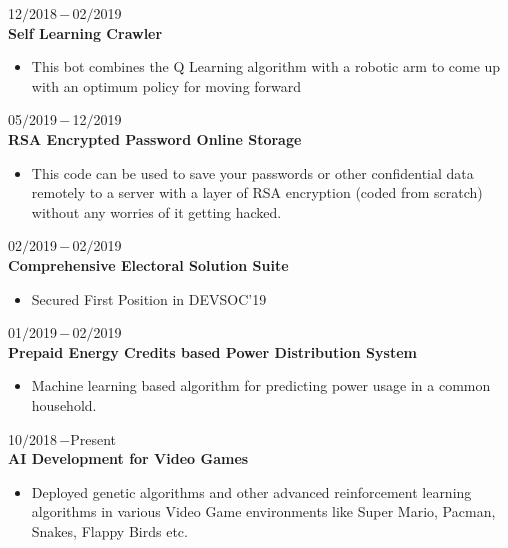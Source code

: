 \documentclass[a4paper, 12pt]{article}
\begin{document}
    \begin{flushleft}
    	12$/$2018\,$-$\,02$/$2019\\
    	\textbf{Self Learning Crawler}
    	\begin{itemize}
    		\item This bot combines the Q Learning algorithm with a robotic arm to come up with an optimum
policy for moving forward
    	\end{itemize}
    \end{flushleft}
    
    \begin{flushleft}
    	05$/$2019\,$-$\,12$/$2019\\
    	\textbf{RSA Encrypted Password Online Storage}
    	\begin{itemize}
    		\item This code can be used to save your passwords or other confidential data remotely to a server with a layer of RSA encryption (coded from scratch) without any worries of it getting hacked.
    	\end{itemize}
    \end{flushleft}
    
    \begin{flushleft}
    	02$/$2019\,$-$\,02$/$2019\\
    	\textbf{Comprehensive Electoral Solution Suite}
    	\begin{itemize}
    		\item Secured First Position in DEVSOC'19
    	\end{itemize}
    \end{flushleft}
    
    \begin{flushleft}
    	01$/$2019\,$-$\,02$/$2019\\
    	\textbf{Prepaid Energy Credits based Power Distribution System}
    	\begin{itemize}
    		\item Machine learning based algorithm for predicting power usage in a common household.
    	\end{itemize}
    \end{flushleft}    
    
    \begin{flushleft}
    	10$/$2018\,$-$Present\\
    	\textbf{AI Development for Video Games}
    	\begin{itemize}
    		\item Deployed genetic algorithms and other advanced reinforcement learning algorithms in various
Video Game environments like Super Mario, Pacman, Snakes, Flappy Birds etc.
    	\end{itemize}
    \end{flushleft}
    
\end{document}
